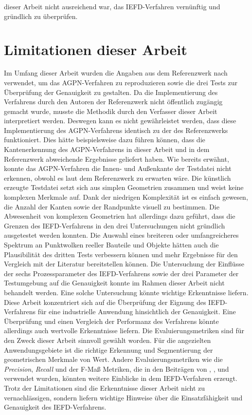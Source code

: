 dieser Arbeit nicht ausreichend war, das IEFD-Verfahren vernünftig und gründlich zu überprüfen.

\section{Limitationen dieser Arbeit}
Im Umfang dieser Arbeit wurden die Angaben aus dem Referenzwerk nach \textcite{ni_edge_2016} verwendet, um das AGPN-Verfahren zu reproduzieren sowie die drei Tests zur Überprüfung der Genauigkeit zu gestalten. Da die Implementierung des Verfahrens durch den Autoren der Referenzwerk nicht öffentlich zugängig gemacht wurde, musste die Methodik durch den Verfasser dieser Arbeit interpretiert werden. Deswegen kann es nicht gewährleistet werden, dass diese Implementierung des AGPN-Verfahrens identisch zu der des Referenzwerks funktioniert. Dies hätte beispielsweise dazu führen können, dass die Kantenerkennung des AGPN-Verfahrens in dieser Arbeit und in dem Referenzwerk abweichende Ergebnisse geliefert haben. Wie bereits erwähnt, konnte das AGPN-Verfahren die Innen- und Außenkante der Testdatei nicht erkennen, obwohl es laut dem Referenzwerk zu erwarten wäre. Die künstlich erzeugte Testdatei setzt sich aus simplen Geometrien zusammen und weist keine komplexen Merkmale auf. Dank der niedrigen Komplexität ist es einfach gewesen, die Anzahl der Kanten sowie der Randpunkte visuell zu bestimmen. Die Abwesenheit von komplexen Geometrien hat allerdings dazu geführt, dass die Grenzen des IEFD-Verfahrens in den drei Untersuchungen nicht gründlich ausgetestet werden konnten. Die Auswahl eines breiteren oder umfangreicheres Spektrum an Punktwolken reeller Bauteile und Objekte hätten auch die Plausibilität des dritten Tests verbessern können und mehr Ergebnisse für den Vergleich mit der Literatur bereitstellen können. Die Untersuchung der Einflüsse der sechs Prozessparameter des IEFD-Verfahrens sowie der drei Parameter der Testumgebung auf die Genauigkeit konnte im Rahmen dieser Arbeit nicht behandelt werden. Eine solche Untersuchung könnte wichtige Erkenntnisse liefern. Diese Arbeit konzentriert sich auf die Überprüfung der Eignung des IEFD-Verfahrens für eine industrielle Anwendung hinsichtlich der Genauigkeit. Eine Überprüfung und einen Vergleich der Performanz des Verfahrens könnte allerdings auch wertvolle Erkenntnisse liefern. Die Evaluierungsmetriken sind für den Zweck dieser Arbeit sinnvoll gewählt worden. Für die angezielten Anwendungsgebiete ist die richtige Erkennung und Segmentierung der geometrischen Merkmale von Wert. Andere Evaluierungsmetriken wie die \textit{Precision}, \textit{Recall} und der F-Maß  Metriken, die in den Beiträgen von \textcite{bazazian_edc-net_2021}, \textcite{ahmed_edge_2018}, \textcite{himeur_pcednet_2021} und \textcite{hu_jsenet_2020} verwendet wurden, könnten weitere Einblicke in dem IEFD-Verfahren erzeugt. Trotz der Limitationen sind die Erkenntnisse dieser Arbeit nicht zu vernachlässigen, sondern liefern wichtige Hinweise über die Einsatzfähigkeit und Genauigkeit des IEFD-Verfahrens.


